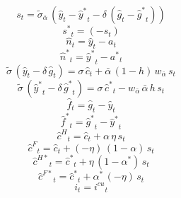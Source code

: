 \begin{dmath}
{{s}}_{t}={{\tilde\sigma_{\bar{\alpha}}}}\, \left({{\hat y}}_{t}-{{\hat y^*}}_{t}-{{\delta}}\, \left({{\hat g}}_{t}-{{\hat g^*}}_{t}\right)\right)
\end{dmath}
\begin{dmath}
{{s^*}}_{t}=\left(-{{s}}_{t}\right)
\end{dmath}
\begin{dmath}
{{\hat n}}_{t}={{\hat y}}_{t}-{{a}}_{t}
\end{dmath}
\begin{dmath}
{{\hat n^*}}_{t}={{\hat y^*}}_{t}-{{a^*}}_{t}
\end{dmath}
\begin{dmath}
{{\tilde{\sigma}}}\, \left({{\hat y}}_{t}-{{\delta}}\, {{\hat g}}_{t}\right)={{\sigma}}\, {{\hat c}}_{t}+{{\bar{\alpha}}}\, \left(1-{{h}}\right)\, {{w_{\bar{\alpha}}}}\, {{s}}_{t}
\end{dmath}
\begin{dmath}
{{\tilde{\sigma}}}\, \left({{\hat y^*}}_{t}-{{\delta}}\, {{\hat g^*}}_{t}\right)={{\sigma}}\, {{\hat c^*}}_{t}-{{w_{\bar{\alpha}}}}\, {{\bar{\alpha}}}\, {{h}}\, {{s}}_{t}
\end{dmath}
\begin{dmath}
{{\hat f}}_{t}={{\hat g}}_{t}-{{\hat y}}_{t}
\end{dmath}
\begin{dmath}
{{\hat f^*}}_{t}={{\hat g^*}}_{t}-{{\hat y^*}}_{t}
\end{dmath}
\begin{dmath}
{{\hat c^H}}_{t}={{\hat c}}_{t}+{{\alpha}}\, {{\eta}}\, {{s}}_{t}
\end{dmath}
\begin{dmath}
{{\hat c^F}}_{t}={{\hat c}}_{t}+\left(-{{\eta}}\right)\, \left(1-{{\alpha}}\right)\, {{s}}_{t}
\end{dmath}
\begin{dmath}
{{\hat c^{H*}}}_{t}={{\hat c^*}}_{t}+{{\eta}}\, \left(1-{{\alpha^*}}\right)\, {{s}}_{t}
\end{dmath}
\begin{dmath}
{{\hat c^{F*}}}_{t}={{\hat c^*}}_{t}+{{\alpha^*}}\, \left(-{{\eta}}\right)\, {{s}}_{t}
\end{dmath}
\begin{dmath}
{{i}}_{t}={{i^{cu}}}_{t}
\end{dmath}

